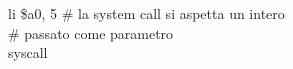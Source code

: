 \documentclass[../main.tex]{subfiles}
\begin{document}
{    \hspace*{0cm} \hspace*{0cm} \hspace*{0cm} \hspace*{0cm} li \$a0, 5 \hspace*{0cm} \hspace*{0cm} \hspace*{0cm} \# la system call si aspetta un intero \\
    \hspace*{0cm} \hspace*{0cm} \hspace*{0cm} \hspace*{0cm} \hspace*{0cm} \hspace*{0cm} \hspace*{0cm} \hspace*{0cm} \hspace*{0cm} \hspace*{0cm} \hspace*{0cm} \hspace*{0cm} \hspace*{0cm} \hspace*{0cm} \hspace*{0cm} \hspace*{0cm} \hspace*{0cm} \# passato come parametro \\
    \hspace*{0cm} \hspace*{0cm} \hspace*{0cm} \hspace*{0cm} syscall \\
}
\end{document}
